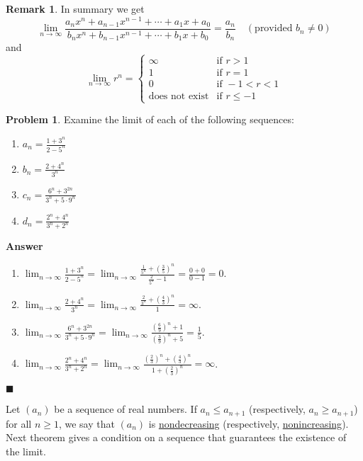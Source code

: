 \documentclass[12pt,letterpaper]{book}
\numberwithin{equation}{section}
\theoremstyle{definition}
\newtheorem{problem}[thm]{\textbf{Problem}}
\newtheorem{remark}[thm]{\textbf{Remark}}
\newenvironment{answer}{\noindent\textbf{Answer}}{\hfill$\blacksquare$\vspace{0.1in}}
\begin{document}
\begin{remark} In summary we get
$$\lim_{n\to \infty} \frac{a_nx^n+a_{n-1}x^{n-1}+\cdots+a_1x+a_0}{b_nx^n+b_{n-1}x^{n-1}+\cdots+b_1x+b_0}=\frac{a_n}{b_n} \quad(\text{provided }b_n\neq 0)$$ and
$$\lim_{n\to \infty} r^n=\begin{cases} \infty & \text{if } r>1 \\
1 & \text{if } r=1 \\
0 & \text{if } -1<r<1 \\
\text{does not exist} &  \text{if } r\leq-1
\end{cases}$$
\end{remark}

\begin{problem} Examine the limit of each of the following sequences:
\begin{multicols}{2}
\begin{enumerate}
\item $a_n=\frac{1+3^n}{2-5^n}$
\item $b_n=\frac{2+4^{n}}{3^n}$
\item $c_n=\frac{6^n+3^{2n}}{3^n+5\cdot 9^n}$
\item $d_n=\frac{2^n+4^{n}}{3^n+2^n}$
\end{enumerate}
\end{multicols}
\end{problem}

\begin{answer}\quad
\begin{enumerate}
\item $\displaystyle{\lim_{n\to \infty}\frac{1+3^n}{2-5^n} = \lim_{n\to \infty}\frac{\frac{1}{5^n}+\left(\frac{3}{5}\right)^n}{\frac{2}{5^n}-1}=\frac{0+0}{0-1}=0}$.
\item $\displaystyle{\lim_{n\to \infty} \frac{2+4^{n}}{3^n}=\lim_{n\to \infty} \frac{\frac{2}{3^n}+\left(\frac{4}{3}\right)^n}{1} =\infty}$.
\item $\displaystyle{\lim_{n\to \infty}\frac{6^n+3^{2n}}{3^n+5\cdot 9^n}=\lim_{n\to \infty}\frac{\left(\frac{6}{9}\right)^n+1}{\left(\frac{3}{9}\right)^n+5}=\frac{1}{5}}$.
\item $\displaystyle{\lim_{n\to \infty}\frac{2^n+4^{n}}{3^n+2^n}=\lim_{n\to \infty}\frac{\left(\frac{2}{3}\right)^n+\left(\frac{4}{3}\right)^n}{1+\left(\frac{2}{3}\right)^n}=\infty}$.
\end{enumerate}
\end{answer}

Let $(a_n)$ be a sequence of real numbers. If $a_n\leq a_{n+1}$ (respectively, $a_n\geq a_{n+1}$) for all $n\geq 1$, we say that $(a_n)$ is \underline{nondecreasing} (respectively, \underline{nonincreasing}). Next theorem gives a condition on a sequence that guarantees the existence of the limit.
\end{document}
